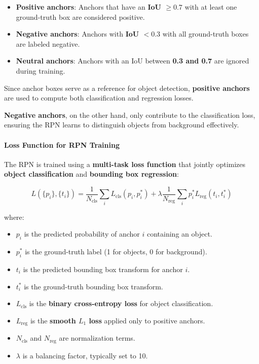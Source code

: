 \begin{itemize}
    \item \textbf{Positive anchors}: Anchors that have an \textbf{IoU $\geq 0.7$} with at least one ground-truth box are considered positive.
    \item \textbf{Negative anchors}: Anchors with \textbf{IoU $< 0.3$} with all ground-truth boxes are labeled negative.
    \item \textbf{Neutral anchors}: Anchors with an IoU between \textbf{0.3 and 0.7} are ignored during training.
\end{itemize}

Since anchor boxes serve as a reference for object detection, \textbf{positive anchors} are used to compute both classification and regression losses.

\newpage

\textbf{Negative anchors}, on the other hand, only contribute to the classification loss, ensuring the RPN learns to distinguish objects from background effectively.

\paragraph{\textbf{Loss Function for RPN Training}}
The RPN is trained using a \textbf{multi-task loss function} that jointly optimizes \textbf{object classification} and \textbf{bounding box regression}:

\[
L(\{p_i\}, \{t_i\}) = \frac{1}{N_{\text{cls}}} \sum_{i} L_{\text{cls}}(p_i, p^*_i) + \lambda \frac{1}{N_{\text{reg}}} \sum_{i} p^*_i L_{\text{reg}}(t_i, t^*_i)
\]

where:
\begin{itemize}
    \item \( p_i \) is the predicted probability of anchor \( i \) containing an object.
    \item \( p^*_i \) is the ground-truth label (1 for objects, 0 for background).
    \item \( t_i \) is the predicted bounding box transform for anchor \( i \).
    \item \( t^*_i \) is the ground-truth bounding box transform.
    \item \( L_{\text{cls}} \) is the \textbf{binary cross-entropy loss} for object classification.
    \item \( L_{\text{reg}} \) is the \textbf{smooth \( L_1 \) loss} applied only to positive anchors.
    \item \( N_{\text{cls}} \) and \( N_{\text{reg}} \) are normalization terms.
    \item \( \lambda \) is a balancing factor, typically set to 10.
\end{itemize}

